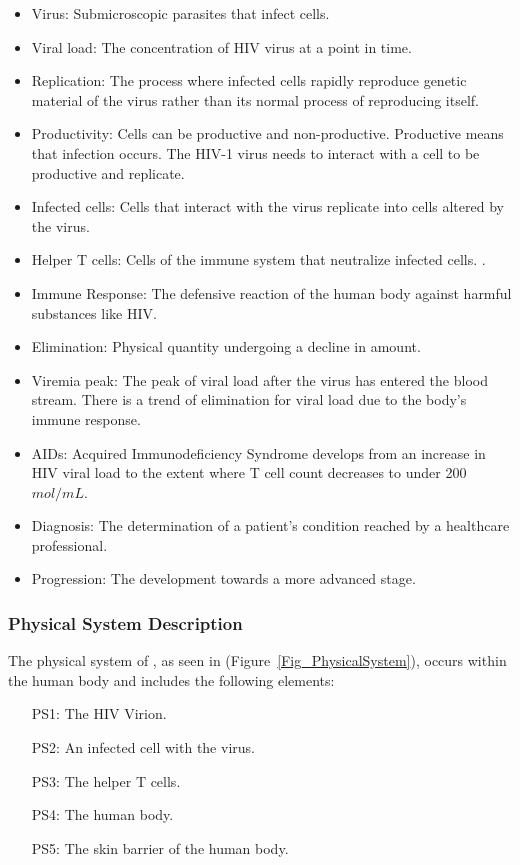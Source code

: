 \documentclass[12pt]{article}
\begin{document}
\begin{itemize}

\item Virus: Submicroscopic parasites that infect cells. 
\item Viral load: The concentration of HIV virus at a point in time.
\item Replication: The process where infected cells rapidly reproduce genetic 
material of the virus rather than its normal process of reproducing itself. 
\citep{BURRELL201739}
\item Productivity: Cells can be productive and non-productive. Productive means 
that infection occurs. The HIV-1 virus needs to interact with a cell to be 
productive and replicate. \citep{BURRELL201739}
\item Infected cells: Cells that interact with the virus replicate into cells 
altered by the virus.
\item Helper T cells: Cells of the immune system that neutralize infected cells. 
\citep{william_2018}.
\item Immune Response: The defensive reaction of the human body against 
harmful substances like HIV.
\item Elimination: Physical quantity undergoing a decline in amount.
\item Viremia peak: The peak of viral load after the virus has entered the blood 
stream. There is a trend of elimination for viral load due to the body's immune 
response. \citep{little1999}
\item AIDs: Acquired Immunodeficiency Syndrome develops from an increase in HIV 
viral load to the extent where T cell count decreases to under 200 
$mol/mL$.\citep{hiv.gov}
\item Diagnosis: The determination of a patient's condition reached by a 
healthcare professional.
\item Progression: The development towards a more advanced 
stage.


\end{itemize}

\subsubsection{Physical System Description} \label{sec_phySystDescrip}

The physical system of \progname{}, as seen in 
(Figure~\ref{Fig_PhysicalSystem}), occurs within the human body and includes the 
following elements:


\begin{itemize}

\item[PS1:] The HIV Virion.

\item[PS2:] An infected cell with the virus.

\item[PS3:] The helper T cells.
 
\item[PS4:] The human body. 

\item[PS5:] The skin barrier of the human body. 

\end{itemize}
\end{document}
